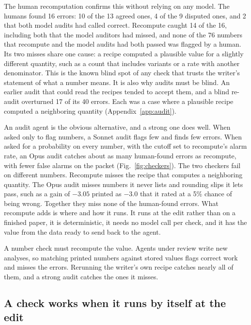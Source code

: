 The human recomputation confirms this without relying on any model. The humans found 16 errors: 10 of the 13 agreed ones,
4 of the 9 disputed ones, and 2 that both model audits had called correct. Recompute caught 14 of the 16, including
both that the model auditors had missed, and none of the 76 numbers that recompute and the model audits had both
passed was flagged by a human. Its two misses share one cause: a recipe computed a plausible value
for a slightly different quantity, such as a count that includes variants or a rate with another denominator. This is
the known blind spot of any check that trusts the writer's statement of what a number means. It is also why audits
must be blind. An earlier audit that could read the recipes tended to accept them, and a blind re-audit overturned 17
of its 40 errors. Each was a case where a plausible recipe computed a neighboring quantity (Appendix~\ref{app:audit}).

An audit agent is the obvious alternative, and a strong one does well. When asked only to flag numbers, a Sonnet audit
flags few and finds few errors. When asked for a probability on every number, with the cutoff set to recompute's
alarm rate, an Opus audit catches about as many human-found errors as recompute, with fewer false alarms on the packet
(Fig.~\ref{fig:checkers}). The two checkers fail on different numbers. Recompute misses the recipe that computes a
neighboring quantity. The Opus audit misses numbers it never lists and rounding slips it lets pass, such as a gain of
$-3.05$ printed as $-3.0$ that it rated at a 5\% chance of being wrong. Together they miss none of the human-found
errors. What recompute adds is where and how it runs. It runs at the edit rather than on a finished paper, it is
deterministic, it needs no model call per check, and it has the value from the data ready to send back to the agent.

\begin{finding}
A number check must recompute the value. Agents under review write new analyses, so matching printed numbers against
stored values flags correct work and misses the errors. Rerunning the writer's own recipe catches nearly all of them,
and a strong audit catches the ones it misses.
\end{finding}

\subsection{A check works when it runs by itself at the edit}
\label{sec:placement-results}

